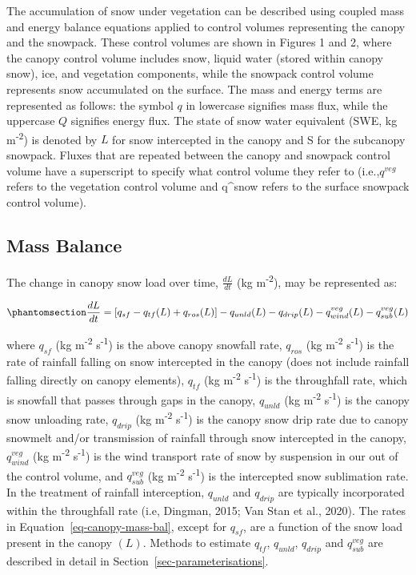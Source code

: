 \documentclass[
  letterpaper,
]{tex/uofsthesis-cs}
\begin{document}
The accumulation of snow under vegetation can be described using coupled
mass and energy balance equations applied to control volumes
representing the canopy and the snowpack. These control volumes are
shown in Figures 1 and 2, where the canopy control volume includes snow,
liquid water (stored within canopy snow), ice, and vegetation
components, while the snowpack control volume represents snow
accumulated on the surface. The mass and energy terms are represented as
follows: the symbol \(q\) in lowercase signifies mass flux, while the
uppercase \(Q\) signifies energy flux. The state of snow water
equivalent (SWE, kg m\textsuperscript{-2}) is denoted by \(L\) for snow
intercepted in the canopy and S for the subcanopy snowpack. Fluxes that
are repeated between the canopy and snowpack control volume have a
superscript to specify what control volume they refer to
(i.e.,\(q^{veg}\) refers to the vegetation control volume and q\^{}snow
refers to the surface snowpack control volume).

\subsection{Mass Balance}\label{sec-mass-bal}

The change in canopy snow load over time, \(\frac{dL}{dt}\) (kg
m\textsuperscript{-2}), may be represented as:

\begin{equation}\phantomsection\label{eq-canopy-mass-bal}{
\frac{dL}{dt} = 
[q_{sf} - q_{tf}(L) + q_{ros}(L)] - q_{unld}(L) - q_{drip}(L) - q_{wind}^{veg}(L) - q_{sub}^{veg}(L)
}\end{equation}

where \(q_{sf}\) (kg m\textsuperscript{-2} s\textsuperscript{-1}) is the
above canopy snowfall rate, \(q_{ros}\) (kg m\textsuperscript{-2}
s\textsuperscript{-1}) is the rate of rainfall falling on snow
intercepted in the canopy (does not include rainfall falling directly on
canopy elements), \(q_{tf}\) (kg m\textsuperscript{-2}
s\textsuperscript{-1}) is the throughfall rate, which is snowfall that
passes through gaps in the canopy, \(q_{unld}\) (kg
m\textsuperscript{-2} s\textsuperscript{-1}) is the canopy snow
unloading rate, \(q_{drip}\) (kg m\textsuperscript{-2}
s\textsuperscript{-1}) is the canopy snow drip rate due to canopy
snowmelt and/or transmission of rainfall through snow intercepted in the
canopy, \(q_{wind}^{veg}\) (kg m\textsuperscript{-2}
s\textsuperscript{-1}) is the wind transport rate of snow by suspension
in our out of the control volume, and \(q_{sub}^{veg}\) (kg
m\textsuperscript{-2} s\textsuperscript{-1}) is the intercepted snow
sublimation rate. In the treatment of rainfall interception,
\(q_{unld}\) and \(q_{drip}\) are typically incorporated within the
throughfall rate (i.e, Dingman, 2015; Van Stan et al., 2020). The rates
in Equation~\ref{eq-canopy-mass-bal}, except for \(q_{sf}\), are a
function of the snow load present in the canopy \((L)\). Methods to
estimate \(q_{tf}\), \(q_{unld}\), \(q_{drip}\) and \(q_{sub}^{veg}\)
are described in detail in Section~\ref{sec-parameterisations}.
\end{document}
